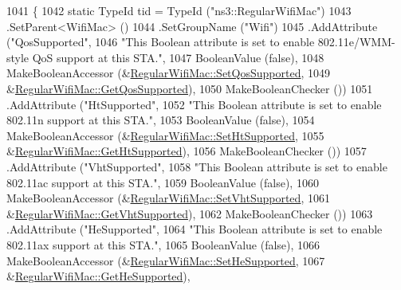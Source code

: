 \begin{DoxyCode}
1041 \{
1042   \textcolor{keyword}{static} TypeId tid = TypeId (\textcolor{stringliteral}{"ns3::RegularWifiMac"})
1043     .SetParent<WifiMac> ()
1044     .SetGroupName (\textcolor{stringliteral}{"Wifi"})
1045     .AddAttribute (\textcolor{stringliteral}{"QosSupported"},
1046                    \textcolor{stringliteral}{"This Boolean attribute is set to enable 802.11e/WMM-style QoS support at this STA."},
1047                    BooleanValue (\textcolor{keyword}{false}),
1048                    MakeBooleanAccessor (&\hyperlink{classns3_1_1RegularWifiMac_a0692f6e43a82d60aecaa674bc82e926f}{RegularWifiMac::SetQosSupported},
1049                                         &\hyperlink{classns3_1_1RegularWifiMac_a590246c305c704d62ce683b9e354a16d}{RegularWifiMac::GetQosSupported}),
1050                    MakeBooleanChecker ())
1051     .AddAttribute (\textcolor{stringliteral}{"HtSupported"},
1052                    \textcolor{stringliteral}{"This Boolean attribute is set to enable 802.11n support at this STA."},
1053                    BooleanValue (\textcolor{keyword}{false}),
1054                    MakeBooleanAccessor (&\hyperlink{classns3_1_1RegularWifiMac_a2b342d2ad0898df9ff0ade65ff39a8c1}{RegularWifiMac::SetHtSupported},
1055                                         &\hyperlink{classns3_1_1RegularWifiMac_a533990b906e4fd7b6852e6d124701eb2}{RegularWifiMac::GetHtSupported}),
1056                    MakeBooleanChecker ())
1057     .AddAttribute (\textcolor{stringliteral}{"VhtSupported"},
1058                    \textcolor{stringliteral}{"This Boolean attribute is set to enable 802.11ac support at this STA."},
1059                    BooleanValue (\textcolor{keyword}{false}),
1060                    MakeBooleanAccessor (&\hyperlink{classns3_1_1RegularWifiMac_a8f007964ef13ead0c2ee5916eba1966b}{RegularWifiMac::SetVhtSupported},
1061                                         &\hyperlink{classns3_1_1RegularWifiMac_afc1f3e8ba1d594c0a8716f8471e9da7a}{RegularWifiMac::GetVhtSupported}),
1062                    MakeBooleanChecker ())
1063     .AddAttribute (\textcolor{stringliteral}{"HeSupported"},
1064                    \textcolor{stringliteral}{"This Boolean attribute is set to enable 802.11ax support at this STA."},
1065                    BooleanValue (\textcolor{keyword}{false}),
1066                    MakeBooleanAccessor (&\hyperlink{classns3_1_1RegularWifiMac_a74075dc0566e812e623ad5a6a05cfe9b}{RegularWifiMac::SetHeSupported},
1067                                         &\hyperlink{classns3_1_1RegularWifiMac_a8c3bcca7041c4dc4c6d8b4651549ad98}{RegularWifiMac::GetHeSupported}),

\end{DoxyCode}

